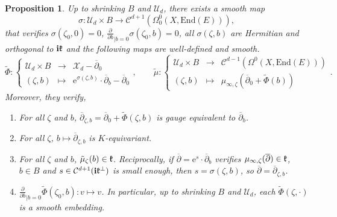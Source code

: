 \documentclass{article}
\newtheorem{proposition}[theorem]{Proposition}
\theoremstyle{remark}
\theoremstyle{definition}
\newcommand{\End}{\mathrm{End}}
\renewcommand{\i}{\boldsymbol{\mathrm{i}}}
\newcommand{\e}{\boldsymbol{\mathrm{e}}}
\newcommand{\mC}{\mathcal{C}}
\newcommand{\mX}{\mathcal{X}}
\newcommand{\mU}{\mathcal{U}}
\newcommand{\dbar}{\overline{\partial}}
\newcommand{\fonction}[4]{\left\{ \begin{array}{rcl}
		\displaystyle #1 & \longrightarrow & \displaystyle #2\\
		\displaystyle #3 & \longmapsto & \displaystyle #4
	\end{array} \right.}
\begin{document}
\begin{proposition}\label{PRO:Tranche déformée P}
    Up to shrinking $B$ and $\mU_d$, there exists a smooth map
    $$
    \sigma : \mU_d \times B \rightarrow \mC^{d + 1}(\Omega^0_0(X,\End(E))),
    $$
    that verifies $\sigma(\zeta_0,0) = 0$, $\frac{\partial}{\partial b}_{|b = 0}\sigma(\zeta_0,b) = 0$, all $\sigma(\zeta,b)$ are Hermitian and orthogonal to $\i\frak{k}$ and the following maps are well-defined and smooth.
    $$
    \tilde{\Phi} : \fonction{\mU_d \times B}{\mX_d - \dbar_0}{(\zeta,b)}{\e^{\sigma(\zeta,b)} \cdot \dbar_b - \dbar_0}, \qquad \tilde{\mu} : \fonction{\mU_d \times B}{\mC^{d - 1}(\Omega^0(X,\End(E)))}{(\zeta,b)}{\mu_{\infty,\zeta}(\dbar_0 + \tilde{\Phi}(b))}.
    $$
    Moreover, they verify,
    \begin{enumerate}
        \item For all $\zeta$ and $b$, $\dbar_{\zeta,b} = \dbar_0 + \tilde{\Phi}(\zeta,b)$ is gauge equivalent to $\dbar_b$.
        \item For all $\zeta$, $b \mapsto \dbar_{\zeta,b}$ is $K$-equivariant.
        \item For all $\zeta$ and $b$, $\tilde{\mu}_\zeta(b) \in \frak{k}$. Reciprocally, if $\dbar = \e^s \cdot \dbar_b$ verifies $\mu_{\infty,\zeta}(\dbar) \in \frak{k}$, $b \in B$ and $s \in \mC^{d + 1}(\i\frak{k}^\bot)$ is small enough, then $s = \sigma(\zeta,b)$, so $\dbar = \dbar_{\zeta,b}$.
        \item $\frac{\partial}{\partial b}_{|b = 0}\tilde{\Phi}(\zeta_0,b) : v \mapsto v$. In particular, up to shrinking $B$ and $\mU_d$, each $\tilde{\Phi}(\zeta,\cdot)$ is a smooth embedding.
    \end{enumerate}
\end{proposition}
\end{document}

